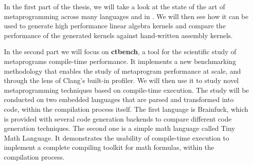 \documentclass[main]{subfiles}
\begin{document}
In the first part of the thesis, we will take a look at the state of the art of
metaprogramming across many languages and in \cpp.
We will then see how it can be used to generate high performance linear algebra
kernels and compare the performance of the generated kernels against
hand-written assembly kernels.

In the second part we will focus on \textbf{ctbench}, a tool for the scientific
study of \cpp metaprograms compile-time performance. It implements a new
benchmarking methodology that enables the study of metaprogram performance
at scale, and through the lens of Clang's built-in profiler.
We will then use it to study novel \cpp metaprogramming techniques based on
compile-time \cpp execution. The study will be conducted on two embedded
languages that are parsed and transformed into \cpp code, within the \cpp
compilation process itself.
The first language is Brainfuck, which is provided with several code generation
backends to compare different code generation techniques. The second one
is a simple math language called Tiny Math Language. It demonstrates
the usability of compile-time \cpp execution to implement a complete compiling
toolkit for math formulas, within the \cpp compilation process.
\end{document}

